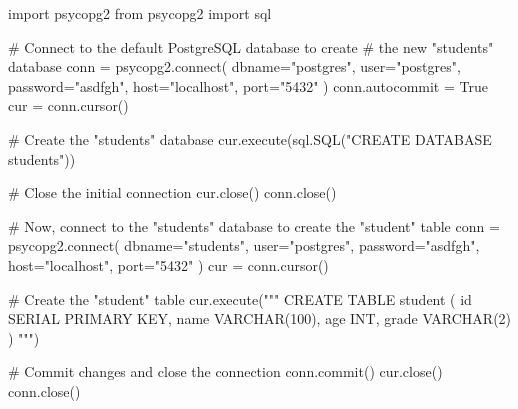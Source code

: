 %
\begin{py}
import psycopg2
from psycopg2 import sql

# Connect to the default PostgreSQL database to create 
# the new "students" database
conn = psycopg2.connect(
    dbname="postgres",
    user="postgres",
    password="asdfgh",
    host="localhost",
    port="5432"
)
conn.autocommit = True
cur = conn.cursor()

# Create the "students" database
cur.execute(sql.SQL("CREATE DATABASE students"))

# Close the initial connection
cur.close()
conn.close()
\end{py}
%

%
\begin{py}
# Now, connect to the "students" database to create the "student" table
conn = psycopg2.connect(
    dbname="students",
    user="postgres",
    password="asdfgh",
    host="localhost",
    port="5432"
)
cur = conn.cursor()

# Create the "student" table
cur.execute("""
    CREATE TABLE student (
        id SERIAL PRIMARY KEY,
        name VARCHAR(100),
        age INT,
        grade VARCHAR(2)
    )
""")

# Commit changes and close the connection
conn.commit()
cur.close()
conn.close()
\end{py}
%



